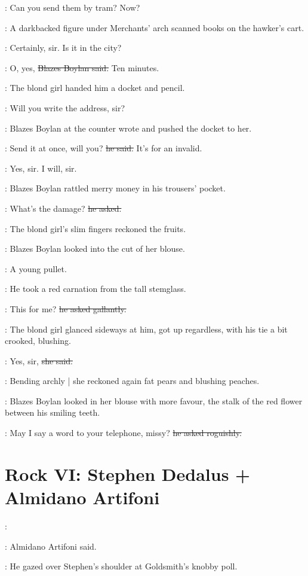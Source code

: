 \boylan:
Can you send them by tram? Now?

:
A darkbacked figure under Merchants' arch
scanned books on the hawker's cart.

\blondgirl:
Certainly, sir.
Is it in the city?

\boylan:
O, yes,
\sout{Blazes Boylan said.}
Ten minutes.

:
The blond girl handed him a docket and pencil.

\blondgirl:
Will you write the address,
sir?

:
Blazes Boylan at the counter wrote
and pushed the docket to her.

\boylan:
Send it at once, will you?
\sout{he said.}
It's for an invalid.

\blondgirl:
Yes, sir. I will, sir.

:
Blazes Boylan rattled merry money in his trousers' pocket.

\boylan:
What's the damage?
\sout{he asked.}

:
The blond girl's slim fingers reckoned the fruits.

:
Blazes Boylan looked into the cut of her blouse.

\boylanint:
A young pullet.

:
He took a red carnation from the tall stemglass.

\boylan:
This for me?
\sout{he asked gallantly.}

:
The blond girl glanced sideways at him,
got up regardless,
with his tie a bit crooked,
blushing.

\blondgirl:
Yes, sir,
\sout{she said.}

:
Bending archly |
she reckoned again fat pears and blushing peaches.

:
Blazes Boylan looked in her blouse with more favour,
the stalk of the red flower between his smiling teeth.

\boylan:
May I say a word to your telephone, missy?
\sout{he asked roguishly.}


\section*{Rock VI: Stephen Dedalus + Almidano Artifoni}


\artifoni:

:
Almidano Artifoni said.

:
He gazed over Stephen's shoulder at Goldsmith's knobby poll.

